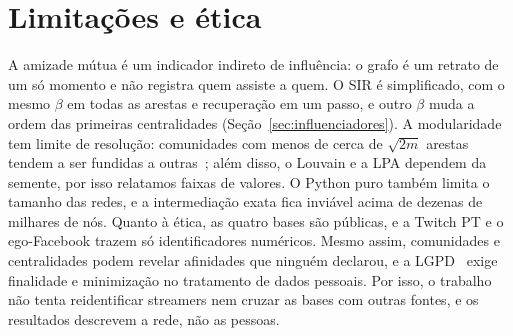 \section{Limitações e ética}\label{sec:limitacoes}

A amizade mútua é um indicador indireto de influência: o grafo é um retrato de um só momento e não
registra quem assiste a quem. O SIR é simplificado, com o mesmo $\beta$ em todas as arestas e
recuperação em um passo, e outro $\beta$ muda a ordem das primeiras centralidades
(Seção~\ref{sec:influenciadores}). A modularidade tem limite de resolução: comunidades com menos de
cerca de $\sqrt{2m}$ arestas tendem a ser fundidas a outras~\cite{fortunato2007}; além disso, o
Louvain e a LPA dependem da semente, por isso relatamos faixas de valores. O Python puro também
limita o tamanho das redes, e a intermediação exata fica inviável acima de dezenas de milhares de nós. Quanto à ética, as quatro bases são públicas, e a Twitch PT e o
ego-Facebook trazem só identificadores numéricos. Mesmo assim, comunidades e centralidades podem
revelar afinidades que ninguém declarou, e a LGPD~\cite{lgpd2018} exige finalidade e minimização no
tratamento de dados pessoais. Por isso, o trabalho não tenta reidentificar streamers nem cruzar as
bases com outras fontes, e os resultados descrevem a rede, não as pessoas.
